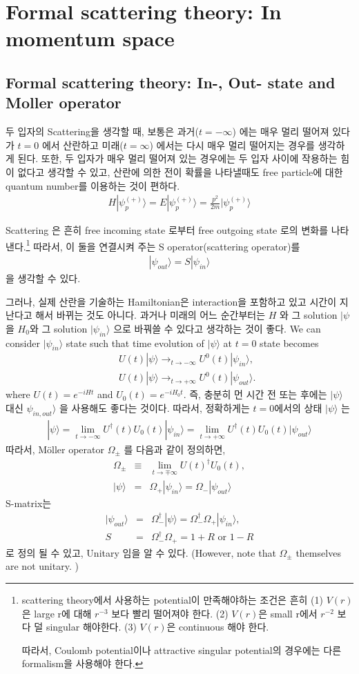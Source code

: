 \documentclass[10pt]{book}
\newcommand{\bea}{\begin{eqnarray}}
\newcommand{\eea}{\end{eqnarray}}
\newcommand{\no}{\nonumber \\}
\def\ra{\rangle}
\begin{document}
  
\chapter{Formal scattering theory: In momentum space  }

\section{Formal scattering theory: In-, Out- state and Moller operator}
두 입자의 Scattering을 생각할 때, 보통은 과거($t=-\infty$) 에는 매우 멀리 떨어져 있다가 $t=0$ 
에서 산란하고 미래($t=\infty$) 에서는 다시 매우 멀리 떨어지는 경우를 생각하게 된다. 
또한, 두 입자가 매우 멀리 떨어져 있는 경우에는 두 입자 사이에 작용하는 힘이 없다고 생각할 수 있고,
산란에 의한 전이 확률을 나타낼때도 free particle에 대한 quantum number를 이용하는 것이
편하다. 
\bea 
H|\psi^{(+)}_p\ra = E |\psi_p^{(+)}\ra =\frac{p^2}{2m}|\psi_p^{(+)}\ra 
\eea 

Scattering 은 흔히 free incoming state 로부터 
free outgoing state 로의 변화를 나타낸다.\footnote{
scattering theory에서 사용하는 potential이 만족해야하는 조건은 
흔히  (1) $V(r)$ 은 large r에 대해 $r^{-3}$ 보다 빨리 떨어져야 한다. 
(2) $V(r)$은 small r에서 $r^{-2}$ 보다 덜 singular 해야한다.
(3) $V(r)$은 continuous 해야 한다. 

따라서, Coulomb potential이나 attractive singular potential의 경우에는 
다른 formalism을 사용해야 한다. 
}
따라서, 이 둘을 연결시켜 주는 S operator(scattering operator)를 
\bea
|\psi_{out}\ra=S|\psi_{in}\ra
\eea
을 생각할 수 있다. 

그러나, 실제 산란을 기술하는 Hamiltonian은 interaction을 포함하고 있고
시간이 지난다고 해서 바뀌는 것도 아니다. 
과거나 미래의 어느 순간부터는 $H$ 와 그 solution $|\psi$ 을 $H_0$와 그 solution 
$|\psi_{in}\ra $ 으로 바꿔쓸 수 있다고 생각하는 것이 좋다.   
We can consider $|\psi_{in}\ra$ state such that 
time evolution of $|\psi\ra$ at $t=0$ state becomes
\bea
& &U(t)|\psi\ra \to_{t\to -\infty}  U^0(t)|\psi_{in}\ra ,\no
& &U(t)|\psi\ra \to_{t\to +\infty}  U^0(t)|\psi_{out}\ra.
\eea
where $U(t)=e^{-iH t}$ and $U_0(t)=e^{-iH_0 t}$. 
즉, 충분히 먼 시간 전 또는 후에는 $|\psi\ra$ 대신 $\psi_{in,out}\ra$ 을 사용해도 
좋다는 것이다. 따라서, 정확하게는 $t=0$에서의 상태 $|\psi\ra$ 는 
\bea 
|\psi\ra=\lim_{t\to -\infty} U^\dagger(t) U_0(t)|\psi_{in}\ra 
        =\lim_{t\to +\infty} U^\dagger(t) U_0(t)|\psi_{out}\ra   
\eea 
따라서, 
M\"{o}ller operator $\Omega_{\pm}$ 를 다음과 같이 정의하면,
\bea
\Omega_{\pm}&\equiv&\lim_{t\to \mp\infty} U(t)^\dagger U_0(t),\no
|\psi\ra&=&\Omega_{+}|\psi_{in}\ra=\Omega_{-}|\psi_{out}\ra
\eea
S-matrix는
\bea
|\psi_{out}\ra&=& \Omega^\dagger_{-}|\psi\ra=\Omega^\dagger_{-}\Omega_{+}|\psi_{in}\ra,\no  
S&=&\Omega^\dagger_{-}\Omega_{+}=1+R \mbox{ or } 1-R
\eea
로 정의 될 수 있고, Unitary 임을 알 수 있다. (However, note that 
$\Omega_{\pm}$ themselves are not unitary. )
\end{document}
